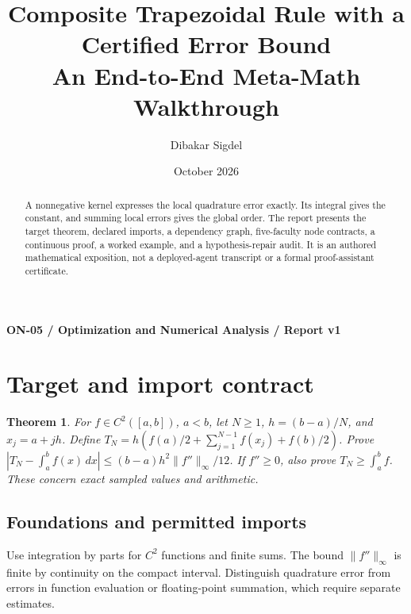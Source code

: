 \documentclass[preprint,12pt,aps,pra,showkeys,amsmath,amssymb,superscriptaddress,floatfix]{revtex4-2}
\newtheorem{theorem}{Theorem}[section]
\theoremstyle{definition}
\theoremstyle{remark}
\begin{document}
\title{Composite Trapezoidal Rule with a Certified Error Bound\\[4pt]\large An End-to-End Meta-Math Walkthrough}

\author{Dibakar Sigdel}


\date{October 2026}

\begin{abstract}

A nonnegative kernel expresses the local quadrature error exactly. Its
integral gives the constant, and summing local errors gives the global
order. The report presents the target theorem, declared imports, a
dependency graph, five-faculty node contracts, a continuous proof, a
worked example, and a hypothesis-repair audit. It is an authored
mathematical exposition, not a deployed-agent transcript or a formal
proof-assistant certificate.

\end{abstract}\maketitle\linespread{1.12}\selectfont

\noindent\textbf{ON-05 / Optimization and Numerical Analysis / Report v1}

\section{Target and import contract}

\begin{theorem}

For \(f\in C^2([a,b])\), \(a<b\), let \(N\ge1\), \(h=(b-a)/N\), and
\(x_j=a+jh\). Define \(T_N=h(f(a)/2+\sum_{j=1}^{N-1}f(x_j)+f(b)/2)\).
Prove \(|T_N-\int_a^b f(x)\,dx|\le (b-a)h^2\|f''\|_\infty/12\). If
\(f''\ge0\), also prove \(T_N\ge\int_a^b f\). These concern exact
sampled values and arithmetic.

\end{theorem}

\subsection{Foundations and permitted imports}

Use integration by parts for \(C^2\) functions and finite sums. The
bound \(\|f''\|_\infty\) is finite by continuity on the compact
interval. Distinguish quadrature error from errors in function
evaluation or floating-point summation, which require separate
estimates.
\end{document}
